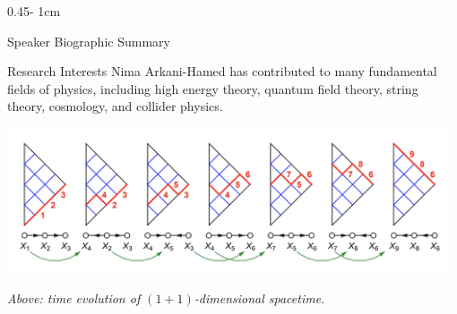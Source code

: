 \documentclass{psuposter}
\begin{document}
\begin{frame}
\begin{columns}[onlytextwidth]
\begin{column}{0.45\textwidth - 1cm}
\begin{block}{Speaker Biographic Summary}
    \end{block}
%
%
%

    \begin{block}{Research Interests}
        Nima Arkani-Hamed has contributed to many fundamental fields of physics, including high energy theory, quantum field theory, string theory, cosmology, and collider physics.
        \begin{center}
	    	\includegraphics[width=0.98\textwidth]{psuposter-images/quiver-nolabel}    		
    	\end{center}
    	\textit{Above: time evolution of $(1+1)$-dimensional spacetime}. \cite{arkani-hamedCausalDiamondsCluster2020}
    \end{block}
\end{column}



\end{columns}
\end{frame}
\end{document}
